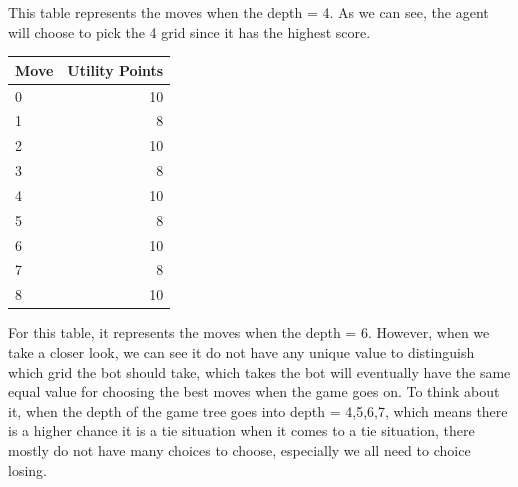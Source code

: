 \documentclass[12pt]{article}
\begin{document}
This table represents the moves when the depth = 4. As we can see, the agent will choose to pick the 4 grid since it has the highest score.
\newline
\begin{center}
\begin{tabular}{|l|r|}
\hline
Move & Utility Points \\ \hline
0 & 10 \\ \hline
1 & 8\\ \hline
2 & 10 \\ \hline
3 & 8 \\ \hline
4 & 10 \\ \hline
5 & 8 \\ \hline
6 & 10\\ \hline 
7 & 8\\ \hline
8 & 10 \\ \hline
\end{tabular}
\end{center}

For this table, it represents the moves when the depth = 6. However, when we take a closer look, we can see it do not have any unique value to distinguish which grid the bot should take, which takes the bot will eventually have the same equal value for choosing the best moves when the game goes on. To think about it, when the depth of the game tree goes into depth = 4,5,6,7, which means there is a higher chance it is a tie situation when it comes to a tie situation, there mostly do not have many choices to choose, especially we all need to choice losing.
\newline
\end{document}
